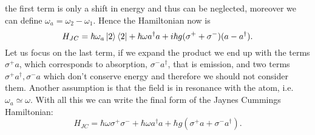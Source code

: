 \documentclass[12pt]{article}
\theoremstyle{plain}
\theoremstyle{definition}
\theoremstyle{remark}
\begin{document}
the first term is only a shift in energy and thus can be neglected, moreover we can define $\omega_a = \omega_2 - \omega_1$. Hence the Hamiltonian now is
\[H_{JC} =  \hbar\omega_a\ket{2}\bra{2} + \hbar \omega a^\dagger a + i\hbar g(\sigma^+ + \sigma^-)(a-a^\dagger). \]
Let us focus on the last term, if we expand the product we end up with the terms $\sigma^+a$, which corresponds to absorption, $\sigma^-a^\dagger$, that is emission, and two terms $\sigma^+a^\dagger,\sigma^-a$ which don't conserve energy and therefore we should not consider them. Another assumption is that the field is in resonance with the atom, i.e. $\omega_a \simeq \omega$. With all this we can write the final form of the Jaynes Cummings Hamiltonian:
\[H_{JC} =  \hbar\omega\sigma^+\sigma^- + \hbar\omega a^\dagger a + \hbar g(\sigma^+a + \sigma^-a^\dagger). \]
\end{document}
